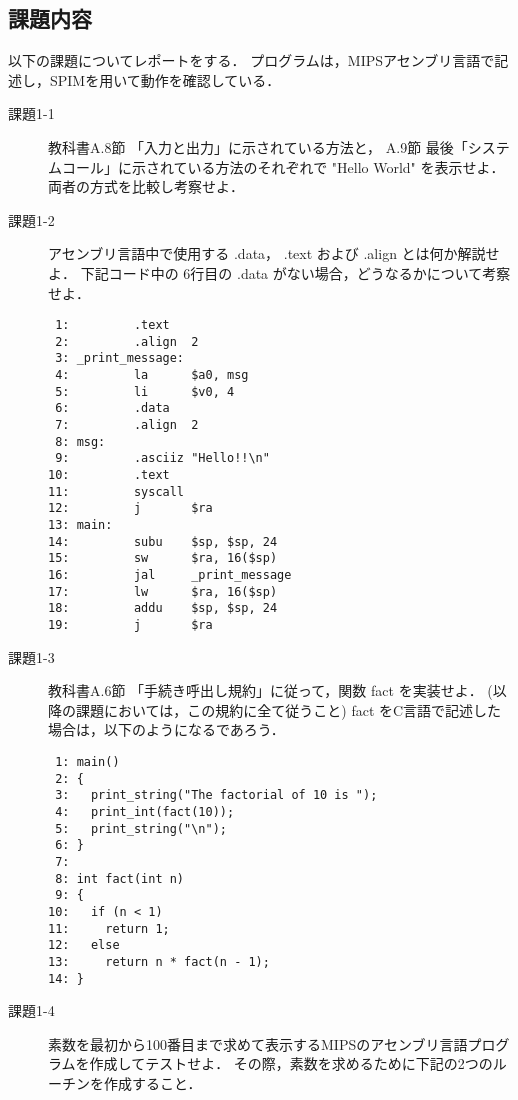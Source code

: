 \documentclass[a4j,11pt]{jarticle}
\begin{document}
\subsection{課題内容}\label{kadai}
以下の課題についてレポートをする． プログラムは，MIPSアセンブリ言語で記述し，SPIMを用いて動作を確認している．
\begin{description}
\item[課題1-1] 教科書A.8節 「入力と出力」に示されている方法と， A.9節 最後「システムコール」に示されている方法のそれぞれで "Hello World" を表示せよ．両者の方式を比較し考察せよ．
\item[課題1-2]アセンブリ言語中で使用する .data， .text および .align とは何か解説せよ． 下記コード中の 6行目の .data がない場合，どうなるかについて考察せよ．
\begin{verbatim}
 1:         .text
 2:         .align  2
 3: _print_message:
 4:         la      $a0, msg
 5:         li      $v0, 4
 6:         .data
 7:         .align  2
 8: msg:
 9:         .asciiz "Hello!!\n"
10:         .text
11:         syscall
12:         j       $ra
13: main:
14:         subu    $sp, $sp, 24
15:         sw      $ra, 16($sp)
16:         jal     _print_message
17:         lw      $ra, 16($sp)
18:         addu    $sp, $sp, 24
19:         j       $ra
\end{verbatim}
\item[課題1-3]教科書A.6節 「手続き呼出し規約」に従って，関数 fact を実装せよ． (以降の課題においては，この規約に全て従うこと) fact をC言語で記述した場合は，以下のようになるであろう． 
\begin{verbatim}
 1: main()
 2: {
 3:   print_string("The factorial of 10 is ");
 4:   print_int(fact(10));
 5:   print_string("\n");
 6: }
 7: 
 8: int fact(int n)
 9: {
10:   if (n < 1)
11:     return 1;
12:   else
13:     return n * fact(n - 1);
14: }
\end{verbatim}
\item[課題1-4]素数を最初から100番目まで求めて表示するMIPSのアセンブリ言語プログラムを作成してテストせよ． その際，素数を求めるために下記の2つのルーチンを作成すること．


\end{description}
\end{document}
